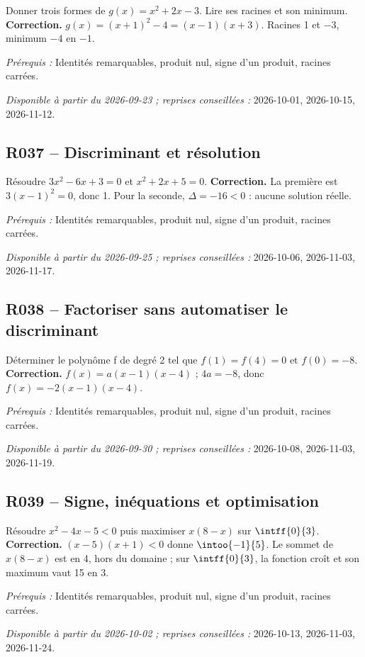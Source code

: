 Donner trois formes de $g(x)=x^2+2x-3$. Lire ses racines et son minimum.
\ifmxteacher\textbf{Correction.} $g(x)=(x+1)^2-4=(x-1)(x+3)$. Racines 1 et $-3$, minimum $-4$ en $-1$.\par\textit{Prérequis :} Identités remarquables, produit nul, signe d’un produit, racines carrées.\par\textit{Disponible à partir du 2026-09-23 ; reprises conseillées :} 2026-10-01, 2026-10-15, 2026-11-12.\fi
{}\subsection*{R037 -- Discriminant et résolution}\label{R037}
Résoudre $3x^2-6x+3=0$ et $x^2+2x+5=0$.
\ifmxteacher\textbf{Correction.} La première est $3(x-1)^2=0$, donc 1. Pour la seconde, $\Delta=-16<0$ : aucune solution réelle.\par\textit{Prérequis :} Identités remarquables, produit nul, signe d’un produit, racines carrées.\par\textit{Disponible à partir du 2026-09-25 ; reprises conseillées :} 2026-10-06, 2026-11-03, 2026-11-17.\fi
{}\subsection*{R038 -- Factoriser sans automatiser le discriminant}\label{R038}
Déterminer le polynôme f de degré 2 tel que $f(1)=f(4)=0$ et $f(0)=-8$.
\ifmxteacher\textbf{Correction.} $f(x)=a(x-1)(x-4)$ ; $4a=-8$, donc $f(x)=-2(x-1)(x-4)$.\par\textit{Prérequis :} Identités remarquables, produit nul, signe d’un produit, racines carrées.\par\textit{Disponible à partir du 2026-09-30 ; reprises conseillées :} 2026-10-08, 2026-11-03, 2026-11-19.\fi
{}\subsection*{R039 -- Signe, inéquations et optimisation}\label{R039}
Résoudre $x^2-4x-5<0$ puis maximiser $x(8-x)$ sur $\intff{0}{3}$.
\ifmxteacher\textbf{Correction.} $(x-5)(x+1)<0$ donne $\intoo{-1}{5}$. Le sommet de $x(8-x)$ est en 4, hors du domaine ; sur $\intff{0}{3}$, la fonction croît et son maximum vaut 15 en 3.\par\textit{Prérequis :} Identités remarquables, produit nul, signe d’un produit, racines carrées.\par\textit{Disponible à partir du 2026-10-02 ; reprises conseillées :} 2026-10-13, 2026-11-03, 2026-11-24.\fi
